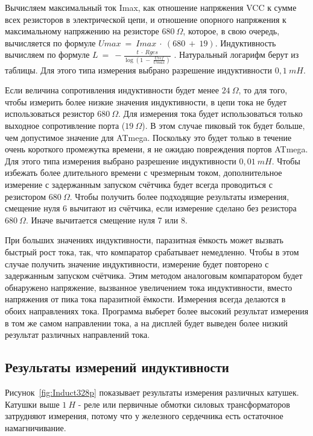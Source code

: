 Вычисляем максимальный ток Imax, как отношение напряжения VCC к сумме всех резисторов в электрической цепи, и 
отношение опорного напряжения к максимальному напряжению на резисторе \(680~\Omega\), которое, в свою очередь, 
вычисляется по формуле \(Umax~=~Imax~\cdot~(680~+~19)\).
Индуктивность вычисляем по формуле \(L~=~-\frac{t~\cdot~Rges}{\log{(1~-~\frac{Uref}{Umax})}}\) .
Натуральный логарифм берут из таблицы. Для этого типа измерения выбрано разрешение индуктивности \(0,1~mH\).

Если величина сопротивления индуктивности будет менее \(24~\Omega\), то для того, чтобы измерить более низкие 
значения индуктивности, в цепи тока не будет использоваться резистор \(680~\Omega\). Для измерения тока будет 
использоваться только выходное сопротивление порта (\(19~\Omega\)). В этом случае пиковый ток будет больше, чем 
допустимое значение для ATmega. Поскольку это будет только в течение очень короткого промежутка времени, я не 
ожидаю повреждения портов ATmega. Для этого типа измерения выбрано разрешение индуктивности \(0,01~mH\). Чтобы 
избежать более длительного времени с чрезмерным током, дополнительное измерение с задержанным запуском счётчика 
будет всегда проводиться с резистором \(680~\Omega\). Чтобы получить более подходящие результаты измерения, 
смещение нуля 6 вычитают из счётчика, если измерение сделано без резистора \(680~\Omega\). Иначе вычитается 
смещение нуля 7 или 8.

При больших значениях индуктивности, паразитная ёмкость может вызвать быстрый рост тока, так, что компаратор 
срабатывает немедленно. Чтобы в этом случае получить значение индуктивности, измерение будет повторено с 
задержанным запуском счётчика. Этим методом аналоговым компаратором будет обнаружено напряжение, вызванное 
увеличением тока индуктивности, вместо напряжения от пика тока паразитной ёмкости. Измерения всегда делаются 
в обоих направлениях тока. Программа выберет более высокий результат измерения в том же самом направлении тока, 
а на дисплей будет выведен более низкий результат различных направлений тока.

\subsection{Результаты измерений индуктивности}
Рисунок~\ref{fig:Induct328p} показывает результаты измерения различных катушек.
Катушки выше \(1~H\) - реле или первичные обмотки силовых трансформаторов затрудняют измерения, потому что 
у железного сердечника есть остаточное намагничивание.

